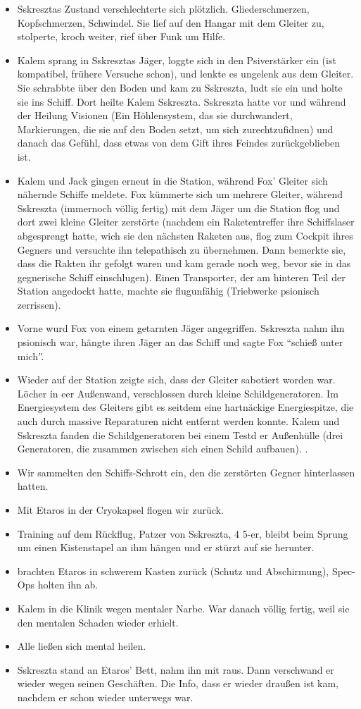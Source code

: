 \documentclass[11pt]{scrartcl}
\begin{document}
\begin{itemize}
\item
  Sskresztas Zustand verschlechterte sich plötzlich. Gliederschmerzen,
  Kopfschmerzen, Schwindel. Sie lief auf den Hangar mit dem Gleiter zu,
  stolperte, kroch weiter, rief über Funk um Hilfe.
\item
  Kalem sprang in Sskresztas Jäger, loggte sich in den Psiverstärker ein
  (ist kompatibel, frühere Versuche schon), und lenkte es ungelenk aus
  dem Gleiter. Sie schrabbte über den Boden und kam zu Sskreszta, ludt
  sie ein und holte sie ins Schiff. Dort heilte Kalem Sskreszta.
  Sskreszta hatte vor und während der Heilung Visionen (Ein
  Höhlensystem, das sie durchwandert, Markierungen, die sie auf den
  Boden setzt, um sich zurechtzufidnen) und danach das Gefühl, dass
  etwas von dem Gift ihres Feindes zurückgeblieben ist.
\item
  Kalem und Jack gingen erneut in die Station, während Fox' Gleiter sich
  nähernde Schiffe meldete. Fox kümmerte sich um mehrere Gleiter,
  während Sskreszta (immernoch völlig fertig) mit dem Jäger um die
  Station flog und dort zwei kleine Gleiter zerstörte (nachdem ein
  Raketentreffer ihre Schiffslaser abgesprengt hatte, wich sie den
  nächsten Raketen aus, flog zum Cockpit ihres Gegners und versuchte ihn
  telepathisch zu übernehmen. Dann bemerkte sie, dass die Rakten ihr
  gefolgt waren und kam gerade noch weg, bevor sie in das gegnerische
  Schiff einschlugen). Einen Transporter, der am hinteren Teil der
  Station angedockt hatte, machte sie flugunfähig (Triebwerke psionisch
  zerrissen).
\item
  Vorne wurd Fox von einem getarnten Jäger angegriffen. Sskreszta nahm
  ihn psionisch war, hängte ihren Jäger an das Schiff und sagte Fox
  ``schieß unter mich''.
\item
  Wieder auf der Station zeigte sich, dass der Gleiter sabotiert worden
  war. Löcher in eer Außenwand, verschlossen durch kleine
  Schildgeneratoren. Im Energiesystem des Gleiters gibt es seitdem eine
  hartnäckige Energiespitze, die auch durch massive Reparaturen nicht
  entfernt werden konnte. Kalem und Sskreszta fanden die
  Schildgeneratoren bei einem Testd er Außenhülle (drei Generatoren, die
  zusammen zwischen sich einen Schild aufbauen). .
\item
  Wir sammelten den Schiffs-Schrott ein, den die zerstörten Gegner
  hinterlassen hatten.
\item
  Mit Etaros in der Cryokapsel flogen wir zurück.
\item
  Training auf dem Rückflug, Patzer von Sskreszta, 4 5-er, bleibt beim
  Sprung um einen Kistenstapel an ihm hängen und er stürzt auf sie
  herunter.
\item
  brachten Etaros in schwerem Kasten zurück (Schutz und Abschirmung),
  Spec-Ops holten ihn ab.
\item
  Kalem in die Klinik wegen mentaler Narbe. War danach völlig fertig,
  weil sie den mentalen Schaden wieder erhielt.
\item
  Alle ließen sich mental heilen.
\item
  Sskreszta stand an Etaros' Bett, nahm ihn mit raus. Dann verschwand er
  wieder wegen seinen Geschäften. Die Info, dass er wieder draußen ist
  kam, nachdem er schon wieder unterwegs war.
\end{itemize}
\end{document}
